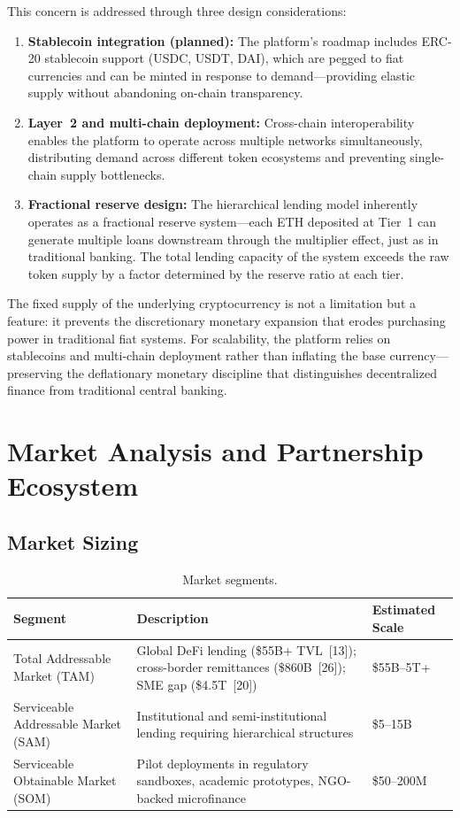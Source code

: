 \documentclass[12pt,a4paper]{report}
\newcommand{\tableheadfont}{\bfseries\small\color{PrimaryBlue}}
\newenvironment{moderntable}[1][H]{%
    \begin{table}[#1]\centering\small%
    \renewcommand{\arraystretch}{1.35}%
}{%
    \end{table}%
}
\begin{document}
This concern is addressed through three design considerations:

\begin{enumerate}[noitemsep]
\item \textbf{Stablecoin integration (planned):} The platform's roadmap includes ERC-20 stablecoin support (USDC, USDT, DAI), which are pegged to fiat currencies and can be minted in response to demand---providing elastic supply without abandoning on-chain transparency.
\item \textbf{Layer~2 and multi-chain deployment:} Cross-chain interoperability enables the platform to operate across multiple networks simultaneously, distributing demand across different token ecosystems and preventing single-chain supply bottlenecks.
\item \textbf{Fractional reserve design:} The hierarchical lending model inherently operates as a fractional reserve system---each ETH deposited at Tier~1 can generate multiple loans downstream through the multiplier effect, just as in traditional banking. The total lending capacity of the system exceeds the raw token supply by a factor determined by the reserve ratio at each tier.
\end{enumerate}

The fixed supply of the underlying cryptocurrency is not a limitation but a feature: it prevents the discretionary monetary expansion that erodes purchasing power in traditional fiat systems. For scalability, the platform relies on stablecoins and multi-chain deployment rather than inflating the base currency---preserving the deflationary monetary discipline that distinguishes decentralized finance from traditional central banking.

\section{Market Analysis and Partnership Ecosystem}

\subsection{Market Sizing}

\begin{moderntable}
\caption{Market segments.}
\begin{tabular}{@{} >{\raggedright}p{4cm} >{\raggedright}p{5cm} >{\raggedright\arraybackslash}p{3cm} @{}}
\toprule
\tableheadfont Segment & \tableheadfont Description & \tableheadfont Estimated Scale \\
\midrule
\rowcolor{RowShade}
Total Addressable Market (TAM) & Global DeFi lending (\$55B+ TVL~[13]); cross-border remittances (\$860B~[26]); SME gap (\$4.5T~[20]) & \$55B--5T+ \\
Serviceable Addressable Market (SAM) & Institutional and semi-institutional lending requiring hierarchical structures & \$5--15B \\
\rowcolor{RowShade}
Serviceable Obtainable Market (SOM) & Pilot deployments in regulatory sandboxes, academic prototypes, NGO-backed microfinance & \$50--200M \\
\bottomrule
\end{tabular}
\end{moderntable}
\end{document}
